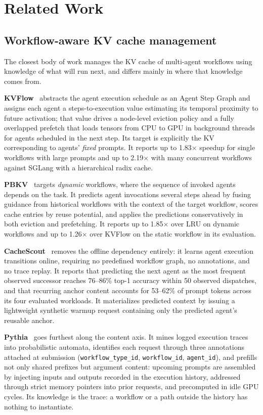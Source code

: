 \section{Related Work}
\label{sec:related}

\subsection{Workflow-aware KV cache management}

The closest body of work manages the KV cache of multi-agent workflows using
knowledge of what will run next, and differs mainly in where that knowledge comes
from.

\textbf{KVFlow}~\cite{pan2025kvflow} abstracts the agent execution schedule as an
Agent Step Graph and assigns each agent a steps-to-execution value estimating its
temporal proximity to future activation; that value drives a node-level eviction
policy and a fully overlapped prefetch that loads tensors from CPU to GPU in
background threads for agents scheduled in the next step. Its target is explicitly
the KV corresponding to agents' \emph{fixed} prompts. It reports up to
1.83$\times$ speedup for single workflows with large prompts and up to
2.19$\times$ with many concurrent workflows against SGLang with a hierarchical
radix cache.

\textbf{PBKV}~\cite{zheng2026pbkv} targets \emph{dynamic} workflows, where the
sequence of invoked agents depends on the task. It predicts agent invocations
several steps ahead by fusing guidance from historical workflows with the context
of the target workflow, scores cache entries by reuse potential, and applies the
predictions conservatively in both eviction and prefetching. It reports up to
1.85$\times$ over LRU on dynamic workflows and up to 1.26$\times$ over KVFlow on
the static workflow in its evaluation.

\textbf{CacheScout}~\cite{zhang2026cachescout} removes the offline dependency
entirely: it learns agent execution transitions online, requiring no predefined
workflow graph, no annotations, and no trace replay. It reports that predicting
the next agent as the most frequent observed successor reaches 76--86\% top-1
accuracy within 50 observed dispatches, and that recurring anchor content accounts
for 53--62\% of prompt tokens across its four evaluated workloads. It materializes
predicted context by issuing a lightweight synthetic warmup request containing
only the predicted agent's reusable anchor.

\textbf{Pythia}~\cite{yu2026pythia} goes furthest along the content axis. It
mines logged execution traces into probabilistic automata, identifies each
request through three annotations attached at submission
(\texttt{workflow\_type\_id}, \texttt{workflow\_id}, \texttt{agent\_id}), and
prefills not only shared prefixes but argument content: upcoming prompts are
assembled by injecting inputs and outputs recorded in the execution history,
addressed through strict memory pointers into prior requests, and precomputed
in idle GPU cycles. Its knowledge is the trace: a workflow or a path outside
the history has nothing to instantiate.

